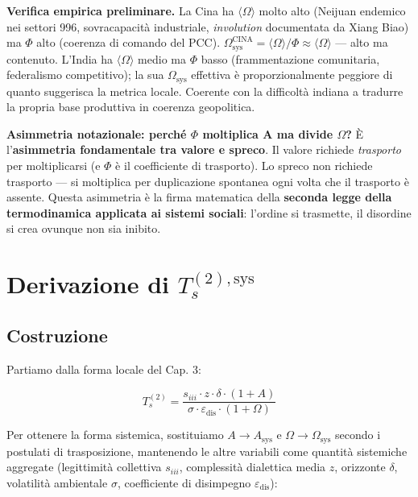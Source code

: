 \Proved{} \textbf{Verifica empirica preliminare.} La Cina ha
\(\langle \Omega \rangle\) molto alto (Neijuan endemico nei settori 996,
sovracapacità industriale, \emph{involution} documentata da Xiang Biao)
ma \(\Phi\) alto (coerenza di comando del PCC).
\(\Omega_{\text{sys}}^{\text{CINA}} = \langle\Omega\rangle/\Phi \approx \langle\Omega\rangle\)
--- alto ma contenuto. L'India ha \(\langle \Omega \rangle\) medio ma
\(\Phi\) basso (frammentazione comunitaria, federalismo competitivo); la
sua \(\Omega_{\text{sys}}\) effettiva è proporzionalmente peggiore di
quanto suggerisca la metrica locale. Coerente con la difficoltà indiana
a tradurre la propria base produttiva in coerenza geopolitica.

\Conj{} \textbf{Asimmetria notazionale: perché $\Phi$ moltiplica A ma divide
$\Omega$?} È l'\textbf{asimmetria fondamentale tra valore e spreco}. Il valore
richiede \emph{trasporto} per moltiplicarsi (e \(\Phi\) è il
coefficiente di trasporto). Lo spreco non richiede trasporto --- si
moltiplica per duplicazione spontanea ogni volta che il trasporto è
assente. Questa asimmetria è la firma matematica della \textbf{seconda
legge della termodinamica applicata ai sistemi sociali}: l'ordine si
trasmette, il disordine si crea ovunque non sia inibito.



\section{\texorpdfstring{Derivazione di
\(T_s^{(2),\text{sys}}\)}{Derivazione di T\_s\^{}\{(2),\textbackslash text\{sys\}\}}}\label{derivazione-di-t_s2textsys}

\subsection{Costruzione}\label{costruzione}

Partiamo dalla forma locale del Cap. 3:

\[
T_s^{(2)} = \frac{s_{iii} \cdot z \cdot \delta \cdot (1 + A)}{\sigma \cdot \varepsilon_{\text{dis}} \cdot (1 + \Omega)}
\]

Per ottenere la forma sistemica, sostituiamo \(A \to A_{\text{sys}}\) e
\(\Omega \to \Omega_{\text{sys}}\) secondo i postulati di trasposizione,
mantenendo le altre variabili come quantità sistemiche aggregate
(legittimità collettiva \(s_{iii}\), complessità dialettica media \(z\),
orizzonte \(\delta\), volatilità ambientale \(\sigma\), coefficiente di
disimpegno \(\varepsilon_{\text{dis}}\)):

